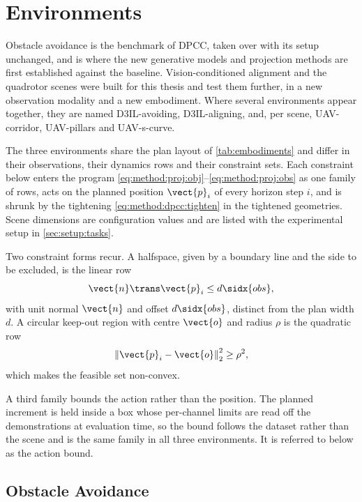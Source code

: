 \section{Environments}\label{sec:method:envs}

Obstacle avoidance is the
benchmark of \ac{DPCC}, taken over with its setup unchanged, and is where the new generative models
and projection methods are first established against the baseline. Vision-conditioned alignment and the
quadrotor scenes were built for this thesis and test them further, in a new observation modality and a
new embodiment. Where several environments appear together, they are named D3IL-avoiding,
D3IL-aligning, and, per scene, UAV-corridor, UAV-pillars and UAV-s-curve.

The three environments share the plan layout of \autoref{tab:embodiments} and differ in their
observations, their dynamics rows and their constraint sets. Each constraint below enters the program
\eqref{eq:method:proj:obj}--\eqref{eq:method:proj:obs} as one family of rows, acts on the planned
position $\vect{p}_{i}$ of every horizon step $i$, and is shrunk by the tightening
\eqref{eq:method:dpcc:tighten} in the tightened geometries. Scene dimensions are configuration values and
are listed with the experimental setup in \autoref{sec:setup:tasks}.

Two constraint forms recur. A halfspace, given by a boundary line and the side to be excluded, is the
linear row
\begin{equation}\label{eq:method:env:halfspace}
  \vect{n}\trans\vect{p}_{i} \le d\sidx{obs} ,
\end{equation}
with unit normal $\vect{n}$ and offset $d\sidx{obs}$, distinct from the plan width $d$. A circular keep-out region with centre $\vect{o}$ and radius
$\rho$ is the quadratic row
\begin{equation}\label{eq:method:env:disk}
  \left\|\vect{p}_{i}-\vect{o}\right\|_{2}^{2} \ge \rho^{2},
\end{equation}
which makes the feasible set non-convex.

A third family bounds the action rather than the position. The planned increment is held inside a
box whose per-channel limits are read off the demonstrations at evaluation time, so the bound
follows the dataset rather than the scene and is the same family in all three environments. It is
referred to below as the action bound.

\subsection{Obstacle Avoidance}\label{sec:method:env:avoiding}

